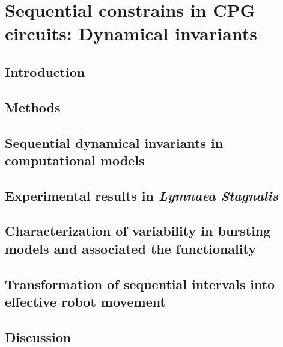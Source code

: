 \chapter{Sequential constrains in CPG circuits: Dynamical invariants}
\label{c-invariants}
\section{Introduction}

\section{Methods}

\section{Sequential dynamical invariants in computational models}
\label{c-invariants-model}

\section{Experimental results in \textit{Lymnaea Stagnalis}}
\label{sec:experimental sussex}

\section{Characterization of variability in bursting models and associated the functionality}
\label{sec:model variability}

\section{Transformation of sequential intervals into effective robot movement}

\section{Discussion}
